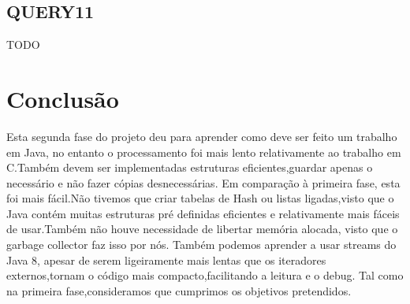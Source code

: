 \documentclass[letterpaper, 10 pt, conference]{IEEEtran} %
\begin{document}
\subsection{QUERY11}

TODO

\section{Conclusão}

Esta segunda fase do projeto deu para aprender como deve ser feito um trabalho em Java, no entanto o processamento foi mais lento relativamente ao trabalho em C.Também devem ser implementadas estruturas eficientes,guardar apenas o necessário e não fazer cópias desnecessárias.
\newline
Em comparação à primeira fase, esta foi mais fácil.Não tivemos que criar tabelas de Hash ou listas ligadas,visto que o Java contém muitas estruturas pré definidas eficientes e relativamente mais fáceis de usar.Também não houve necessidade de libertar memória alocada, visto que o garbage collector faz isso por nós.
\newline
Também podemos aprender a usar streams do Java 8, apesar de serem ligeiramente mais lentas que os iteradores externos,tornam o código mais compacto,facilitando a leitura e o debug.
\newline
Tal como na primeira fase,consideramos que cumprimos os objetivos pretendidos.












\addtolength{\textheight}{-12cm}   %

\end{document}
